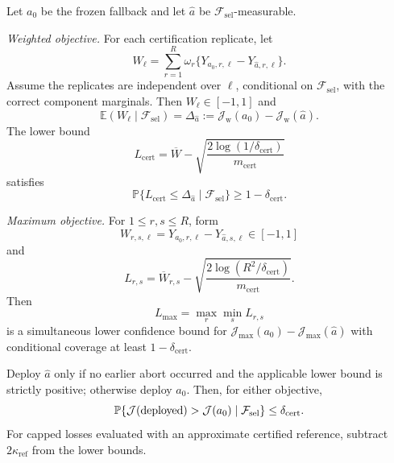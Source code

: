 \begin{theorem}
\label{thm:s2-fallback}
Let \(a_0\) be the frozen fallback and let \(\widehat a\) be
\(\mathcal F_{\mathrm{sel}}\)-measurable.

\emph{Weighted objective.}
For each certification replicate, let
\[
 W_\ell
 =
 \sum_{r=1}^R
 \omega_r
 \{Y_{a_0,r,\ell}-Y_{\widehat a,r,\ell}\}.
\]
Assume the replicates are independent over \(\ell\), conditional on
\(\mathcal F_{\mathrm{sel}}\), with the correct component marginals.  Then
\(W_\ell\in[-1,1]\) and
\[
 \mathbb E(W_\ell\mid\mathcal F_{\mathrm{sel}})
 =
 \Delta_{\widehat a}
 :=
 \mathcal J_{\mathrm w}(a_0)
 -
 \mathcal J_{\mathrm w}(\widehat a).
\]
The lower bound
\begin{equation}
 L_{\mathrm{cert}}
 =
 \overline W
 -
 \sqrt{
  \frac{2\log(1/\delta_{\mathrm{cert}})}
       {m_{\mathrm{cert}}}
 }
 \label{eq:s2-cert-lcb}
\end{equation}
satisfies
\begin{equation}
 \mathbb P\{
  L_{\mathrm{cert}}\leq\Delta_{\widehat a}
  \mid\mathcal F_{\mathrm{sel}}
 \}
 \geq1-\delta_{\mathrm{cert}}.
 \label{eq:s2-cert-coverage}
\end{equation}

\emph{Maximum objective.}
For \(1\leq r,s\leq R\), form
\[
 W_{r,s,\ell}
 =
 Y_{a_0,r,\ell}-Y_{\widehat a,s,\ell}
 \in[-1,1]
\]
and
\[
 L_{r,s}
 =
 \overline W_{r,s}
 -
 \sqrt{
  \frac{2\log(R^2/\delta_{\mathrm{cert}})}
       {m_{\mathrm{cert}}}
 }.
\]
Then
\begin{equation}
 L_{\max}
 =
 \max_r\min_sL_{r,s}
 \label{eq:s2-max-lcb}
\end{equation}
is a simultaneous lower confidence bound for
\(\mathcal J_{\max}(a_0)-\mathcal J_{\max}(\widehat a)\) with conditional
coverage at least \(1-\delta_{\mathrm{cert}}\).

Deploy \(\widehat a\) only if no earlier abort occurred and the applicable
lower bound is strictly positive; otherwise deploy \(a_0\).  Then, for either
objective,
\begin{equation}
 \mathbb P\{
  \mathcal J(\textnormal{deployed})
  >
  \mathcal J(a_0)
 \mid\mathcal F_{\mathrm{sel}}
 \}
 \leq\delta_{\mathrm{cert}}.
 \label{eq:s2-no-harm}
\end{equation}
For capped losses evaluated with an approximate certified reference, subtract
\(2\kappa_{\mathrm{ref}}\) from the lower bounds.
\end{theorem}

